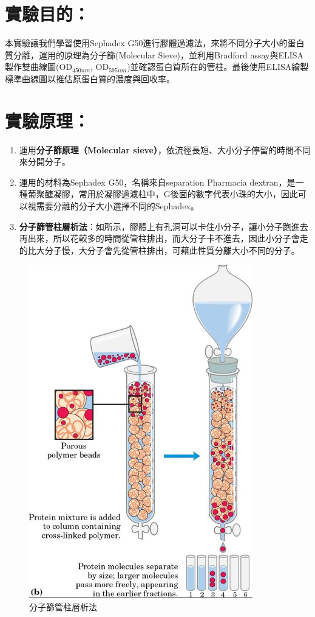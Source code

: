 \setlength{\parindent}{2em} %

\section*{實驗目的：}
本實驗讓我們學習使用Sephadex G50進行膠體過濾法，來將不同分子大小的蛋白質分離，運用的原理為分子篩(Molecular Sieve)，並利用Bradford assay與ELISA製作雙曲線圖(OD$_{450nm}$, OD$_{595nm}$)並確認蛋白質所在的管柱。最後使用ELISA繪製標準曲線圖以推估原蛋白質的濃度與回收率。


\section*{實驗原理：}

\begin{enumerate}
  \item 運用\textbf{分子篩原理（Molecular sieve）}，依流徑長短、大小分子停留的時間不同來分開分子。
  \item 運用的材料為Sephadex G50，名稱來自separation Pharmacia dextran，是一種葡聚醣凝膠，常用於凝膠過濾柱中，G後面的數字代表小珠的大小，因此可以視需要分離的分子大小選擇不同的Sephadex。
  \item \textbf{分子篩管柱層析法}：如所示，膠體上有孔洞可以卡住小分子，讓小分子跑進去再出來，所以花較多的時間從管柱排出，而大分子卡不進去，因此小分子會走的比大分子慢，大分子會先從管柱排出，可藉此性質分離大小不同的分子。
\end{enumerate}

\begin{figure}[H]
\centering
\includegraphics[width=.5\textwidth]{paste_src/2023-10-22-15-08-32.png}
\caption{分子篩管柱層析法}
\label{fig:mf}
\end{figure}


